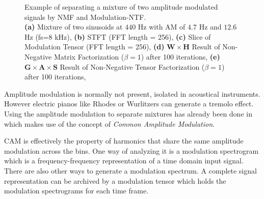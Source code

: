 \begin{figure}[H]
    \centering
    \tiny
    \hfill
    \subfloat[Spectrogram]{
    }%
    \hfill

    \subfloat[NMF]{
    }\hfill
    \hfill
    \caption{Example of separating a mixture of two amplitude modulated signals by NMF and Modulation-NTF. \\ \textbf{(a)} Mixture of two sinusoids at $440$ Hz with AM of $4.7$ Hz and $12.6$ Hz (fs=$8$ kHz), \textbf{(b)} STFT (FFT length = 256), \textbf{(c)} Slice of Modulation Tensor (FFT length = 256),  \textbf{(d)} $\mathbf{W} \times \mathbf{H}$ Result of Non-Negative Matrix Factorization ($\beta = 1$) after 100 iterations, \textbf{(e)}  $\mathbf{G} \times \mathbf{A} \times \mathbf{S} $ Result of Non-Negative Tensor Factorization ($\beta = 1$) after 100 iterations,}
    \label{fig:tensor}
\end{figure}

Amplitude modulation is normally not present, isolated in acoustical instruments. However electric pianos like Rhodes or Wurlitzers can generate a tremolo effect. Using the amplitude modulation to separate mixtures has already been done in \cite{li09} which makes use of the concept of \emph{Common Amplitude Modulation}.

\textsc{CAM} is effectively the property of harmonics that share the same amplitude modulation across the bins.
One way of analyzing it is a modulation spectrogram which is a frequency-frequency representation of a time domain input signal.
There are also other ways to generate a modulation spectrum.
A complete signal representation can be archived by a modulation tensor which holds the modulation spectrograms for each time frame.

